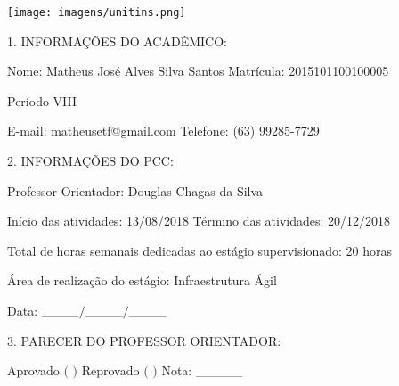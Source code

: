 
\imprimircapa

\imprimirfolhaderosto


%
% 
%
\begin{folhadeaprovacao}

  		\texttt{[image: imagens/unitins.png]}
  		
  		\ABNTEXchapterfont\large   1. INFORMAÇÕES DO ACADÊMICO:
				
  		\normalsize Nome: Matheus José Alves Silva Santos
  		\tab Matrícula: 2015101100100005
  
  		Período VIII	
  		
  		E-mail: matheusetf@gmail.com
  		\tab Telefone: (63) 99285-7729
  		
  		\par
  		\vspace*{0.5cm}     
  		  
  		\ABNTEXchapterfont\large   2. INFORMAÇÕES DO PCC:
		  		\normalsize 
		
		Professor Orientador: Douglas Chagas da Silva
		
		Início das atividades: 13/08/2018 \tab \tab Término das atividades: 20/12/2018
		
		Total de horas semanais dedicadas ao estágio supervisionado: 20 horas
		
		Área de realização do estágio: Infraestrutura Ágil
		
		
		Data: \_\_\_\_$/$\_\_\_\_$/$\_\_\_\_
		\par
		\vspace*{0.5cm}

  		\ABNTEXchapterfont\large   3. PARECER DO PROFESSOR ORIENTADOR:
  		\normalsize 
  		
  		Aprovado $($ \tab $)$ \tab \tab Reprovado $($ \tab $)$  \tab \tab Nota: \_\_\_\_\_
  		

\end{folhadeaprovacao}
